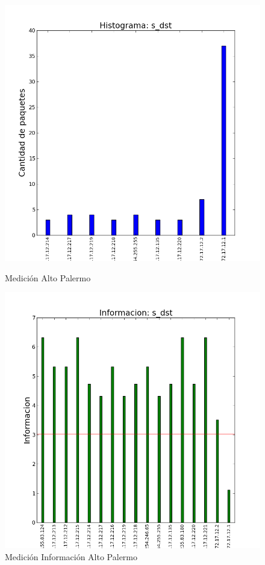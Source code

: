 \documentclass[10pt, a4paper]{article}
\begin{document}
\begin{figure}[H]
   \begin{minipage}{0.5\linewidth}
     \includegraphics[width=\linewidth]{../imgs/snifAlto-ips_s_dst_hist.png}
     \caption{Medición Alto Palermo}\label{fig:Alto-dst-hist}
   \end{minipage}
  \hfill
   \begin{minipage}{0.5\linewidth}
     \includegraphics[width=\linewidth]{../imgs/snifAlto-ips_s_dst_info.png}
     \caption{Medición Información Alto Palermo}\label{fig:Alto-dst-info}
   \end{minipage}
 \end{figure}
\end{document}
